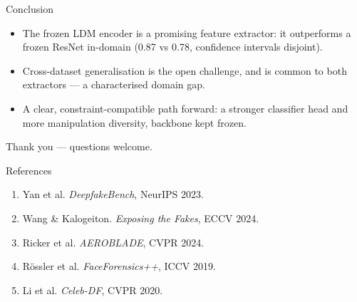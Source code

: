 \documentclass[aspectratio=169,11pt]{beamer}
\begin{document}
\begin{frame}{Conclusion}
  \begin{itemize}
    \item The frozen LDM encoder is a \alert{promising} feature extractor:
          it outperforms a frozen ResNet in-domain (0.87 vs 0.78,
          confidence intervals disjoint).
    \item Cross-dataset generalisation is the \alert{open challenge}, and is
          common to both extractors --- a characterised domain gap.
    \item A clear, constraint-compatible path forward: a stronger
          classifier head and more manipulation diversity, backbone kept
          frozen.
  \end{itemize}
\end{frame}

\begin{frame}[standout]
  Thank you --- questions welcome.
\end{frame}

\appendix

\begin{frame}{References}
  \footnotesize
  \begin{enumerate}
    \item Yan et al. \emph{DeepfakeBench}, NeurIPS 2023.
    \item Wang \& Kalogeiton. \emph{Exposing the Fakes}, ECCV 2024.
    \item Ricker et al. \emph{AEROBLADE}, CVPR 2024.
    \item Rössler et al. \emph{FaceForensics++}, ICCV 2019.
    \item Li et al. \emph{Celeb-DF}, CVPR 2020.
  \end{enumerate}
\end{frame}
\end{document}
